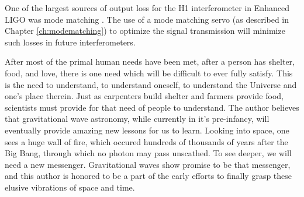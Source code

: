 One of the largest sources of output loss for the H1 interferometer in Enhanced LIGO was mode matching \cite{Tobin}. %
The use of a mode matching servo (as described in Chapter \ref{ch:modematching}) to optimize the signal transmission will minimize such losses in future interferometers.

After most of the primal human needs have been met, after a person has shelter, food, and love, there is one need which will be difficult to ever fully satisfy. %
This is the need to understand, to understand oneself, to understand the Universe and one's place therein. %
Just as carpenters build shelter and farmers provide food, scientists must provide for that need of people to understand. %
The author believes that gravitational wave astronomy, while currently in it's pre-infancy, will eventually provide amazing new lessons for us to learn. %
Looking into space, one sees a huge wall of fire, which occured hundreds of thousands of years after the Big Bang, through which no photon may pass unscathed. %
To see deeper, we will need a new messenger. %
Gravitational waves show promise to be that messenger, and this author is honored to be a part of the early efforts to finally grasp these elusive vibrations of space and time.
